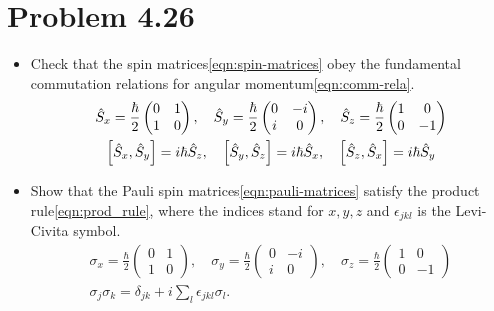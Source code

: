 \documentclass[../main.tex]{subfiles}
\begin{document}
\section{Problem 4.26}

\begin{itemize}
    \item Check that the spin matrices\eqref{eqn:spin-matrices} obey the fundamental commutation relations for angular momentum\eqref{eqn:comm-rela}.
        \begin{gather}
            \hat{S}_x = \frac{\hbar}{2}\begin{pmatrix}0&1\\1&0\end{pmatrix},
            \quad
            \hat{S}_y = \frac{\hbar}{2}\begin{pmatrix}0&-i\\i&0\end{pmatrix},
            \quad
            \hat{S}_z = \frac{\hbar}{2}\begin{pmatrix}1&0\\0&-1\end{pmatrix}
            \label{eqn:spin-matrices} 
            \\
            \comm{\hat{S}_x}{\hat{S}_y}=i\hbar\hat{S}_z,
            \quad
            \comm{\hat{S}_y}{\hat{S}_z}=i\hbar\hat{S}_x,
            \quad
            \comm{\hat{S}_z}{\hat{S}_x}=i\hbar\hat{S}_y
            \label{eqn:comm-rela} 
        \end{gather}
    \item Show that the Pauli spin matrices\eqref{eqn:pauli-matrices} satisfy the product rule\eqref{eqn:prod_rule}, where the indices stand for $x,y,z$ and $\epsilon_{jkl}$ is the Levi-Civita symbol.
        \begin{gather}
            \sigma_x = \frac{\hbar}{2}\begin{pmatrix}0&1\\1&0\end{pmatrix},
            \quad
            \sigma_y = \frac{\hbar}{2}\begin{pmatrix}0&-i\\i&0\end{pmatrix},
            \quad
            \sigma_z = \frac{\hbar}{2}\begin{pmatrix}1&0\\0&-1\end{pmatrix}
            \label{eqn:pauli-matrices} 
            \\
            \sigma_j\sigma_k=\delta_{jk}+i\sum_l\epsilon_{jkl}\sigma_l\label{eqn:prod_rule}.
        \end{gather}
        
\end{itemize}
\end{document}
